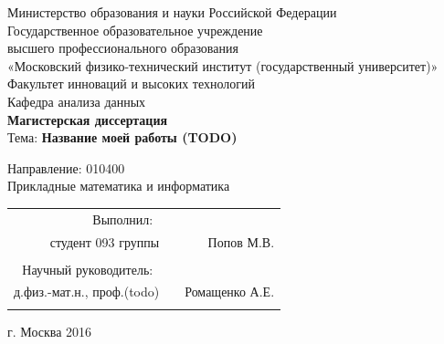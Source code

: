 \documentclass[a4paper]{article}
\begin{document}
\begin{titlepage}
	\begin{center}
		\hfill \break
		\large{Министерство образования и науки Российской Федерации}\\
		\hfill \break
		\normalsize{Государственное образовательное учреждение}\\ 
		\normalsize{высшего профессионального образования}\\
		\normalsize{«Московский физико-технический институт (государственный университет)»}\\
		\normalsize{Факультет инноваций и высоких технологий}\\
		\normalsize{Кафедра анализа данных}\\
		\hfill \break
		\hfill \break
		\hfill \break
		\Large{\textbf{Магистерская диссертация}}\\
		\hfill \break
		\large{Тема: \textbf{Название моей работы (TODO)}}\\
	\end{center}

	\begin{flushright}
		\hfill \break
		Направление:  010400\\
		Прикладные математика и информатика\\
		\hfill \break
		\hfill \break
		\hfill \break
	\end{flushright}
	
	\begin{flushright}
		\normalsize{
			\begin{tabular}{rcr}
				Выполнил:\ \\ студент 093 группы & \underline{\hspace{3cm}} & Попов М.В. \\\\
				Научный руководитель:\ \\ д.физ.-мат.н., проф.(todo) & \underline{\hspace{3cm}}& Ромащенко А.Е. \\\\
			\end{tabular}
		}
	\end{flushright}

	\begin{center}
		\hfill \break
	\end{center}

	\begin{center} г. Москва 2016 \end{center}
	\thispagestyle{empty}
\end{titlepage}
 
\end{document}
